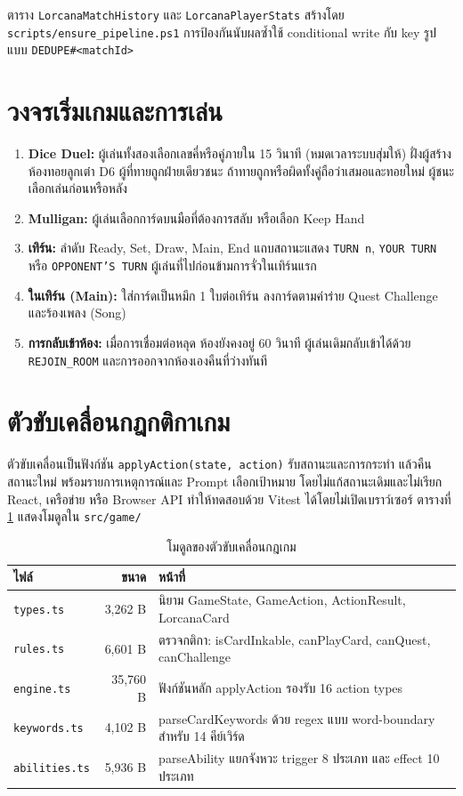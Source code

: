 ตาราง \texttt{LorcanaMatchHistory} และ \texttt{LorcanaPlayerStats} สร้างโดย \texttt{scripts/ensure\_pipeline.ps1} การป้องกันนับผลซ้ำใช้ conditional write กับ key รูปแบบ \texttt{DEDUPE\#<matchId>}

\section{วงจรเริ่มเกมและการเล่น}
\label{sec:game_flow}

\begin{enumerate}
    \item \textbf{Dice Duel:} ผู้เล่นทั้งสองเลือกเลขคี่หรือคู่ภายใน 15 วินาที (หมดเวลาระบบสุ่มให้) ฝั่งผู้สร้างห้องทอยลูกเต๋า D6 ผู้ที่ทายถูกฝ่ายเดียวชนะ ถ้าทายถูกหรือผิดทั้งคู่ถือว่าเสมอและทอยใหม่ ผู้ชนะเลือกเล่นก่อนหรือหลัง
    \item \textbf{Mulligan:} ผู้เล่นเลือกการ์ดบนมือที่ต้องการสลับ หรือเลือก Keep Hand
    \item \textbf{เทิร์น:} ลำดับ Ready, Set, Draw, Main, End แถบสถานะแสดง \texttt{TURN n}, \texttt{YOUR TURN} หรือ \texttt{OPPONENT'S TURN} ผู้เล่นที่ไปก่อนข้ามการจั่วในเทิร์นแรก
    \item \textbf{ในเทิร์น (Main):} ใส่การ์ดเป็นหมึก 1 ใบต่อเทิร์น ลงการ์ดตามค่าร่าย Quest Challenge และร้องเพลง (Song)
    \item \textbf{การกลับเข้าห้อง:} เมื่อการเชื่อมต่อหลุด ห้องยังคงอยู่ 60 วินาที ผู้เล่นเดิมกลับเข้าได้ด้วย \texttt{REJOIN\_ROOM} และการออกจากห้องเองคืนที่ว่างทันที
\end{enumerate}

\section{ตัวขับเคลื่อนกฎกติกาเกม}

ตัวขับเคลื่อนเป็นฟังก์ชัน \texttt{applyAction(state, action)} รับสถานะและการกระทำ แล้วคืนสถานะใหม่ พร้อมรายการเหตุการณ์และ Prompt เลือกเป้าหมาย โดยไม่แก้สถานะเดิมและไม่เรียก React, เครือข่าย หรือ Browser API ทำให้ทดสอบด้วย Vitest ได้โดยไม่เปิดเบราว์เซอร์ ตารางที่ \ref{tab:engine_modules} แสดงโมดูลใน \texttt{src/game/}

\begin{table}[H]
\centering
\caption{โมดูลของตัวขับเคลื่อนกฎเกม}
\label{tab:engine_modules}
\begin{tabularx}{\textwidth}{lrX}
\toprule
\textbf{ไฟล์} & \textbf{ขนาด} & \textbf{หน้าที่} \\
\midrule
\texttt{types.ts} & 3,262 B & นิยาม GameState, GameAction, ActionResult, LorcanaCard \\
\texttt{rules.ts} & 6,601 B & ตรวจกติกา: isCardInkable, canPlayCard, canQuest, canChallenge \\
\texttt{engine.ts} & 35,760 B & ฟังก์ชันหลัก applyAction รองรับ 16 action types \\
\texttt{keywords.ts} & 4,102 B & parseCardKeywords ด้วย regex แบบ word-boundary สำหรับ 14 คีย์เวิร์ด \\
\texttt{abilities.ts} & 5,936 B & parseAbility แยกจังหวะ trigger 8 ประเภท และ effect 10 ประเภท \\
\bottomrule
\end{tabularx}
\end{table}

